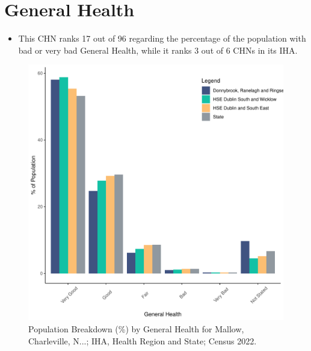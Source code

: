 \documentclass{article}
\begin{document}
\pagebreak

\section{General Health}\label{sect:GenHealth}
\begin{itemize}
\item  This CHN ranks  17 out of 96 regarding the percentage of the population with bad or very bad General Health, while it ranks   3 out of 6 CHNs in its IHA.
\end{itemize}
\begin{figure}[h]
	\centering
	\includegraphics[width = 150mm]{../figures/GenED.pdf}
	\caption{Population Breakdown (\%) by General Health for Mallow, Charleville, N...; IHA, Health Region and State;  Census 2022.}
	\label{fig:2ae19629-1a6a-13a3-e055-000000000001}
	\end{figure}
\end{document}
